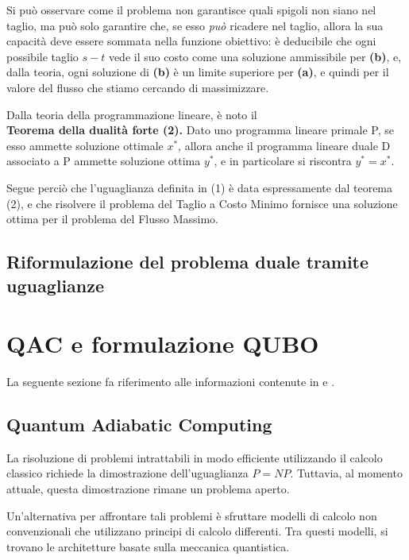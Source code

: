 \documentclass{article}
\begin{document}
Si può osservare come il problema non garantisce quali spigoli non siano nel taglio, ma può solo garantire che, se esso \emph{può} ricadere nel taglio, allora la sua capacità
deve essere sommata nella funzione obiettivo: è deducibile che ogni possibile taglio $s-t$ vede il suo costo come una soluzione ammissibile per \textbf{(b)}, e, dalla teoria, ogni
soluzione di \textbf{(b)} è un limite superiore per \textbf{(a)}, e quindi per il valore del flusso che stiamo cercando di massimizzare.

Dalla teoria della programmazione lineare, è noto il\\

\textbf{Teorema della dualità forte (2).} Dato uno programma lineare primale P, se esso ammette soluzione ottimale $x^*$, allora anche il programma lineare duale D associato a P 
ammette soluzione ottima $y^*$, e in particolare si riscontra $y^* = x^*$.

Segue perciò che l'uguaglianza definita in (1) è data espressamente dal teorema (2), e che risolvere il problema del Taglio a Costo Minimo fornisce una soluzione ottima per il 
problema del Flusso Massimo. 
\pagebreak

\subsection{Riformulazione del problema duale tramite \hfill \break uguaglianze}
 

\section{QAC e formulazione QUBO}
La seguente sezione fa riferimento alle informazioni contenute in \cite{MCGEOCH2020169} e \cite{DBLP:journals/corr/abs-1811-11538}.

\subsection{Quantum Adiabatic Computing}
La risoluzione di problemi intrattabili in modo efficiente utilizzando il calcolo classico richiede la dimostrazione dell'uguaglianza $P = NP$. Tuttavia, al momento attuale, questa dimostrazione rimane un problema aperto.

Un'alternativa per affrontare tali problemi è sfruttare modelli di calcolo non convenzionali che utilizzano principi di calcolo differenti. Tra questi modelli, si trovano le architetture basate sulla meccanica quantistica.
\end{document}

